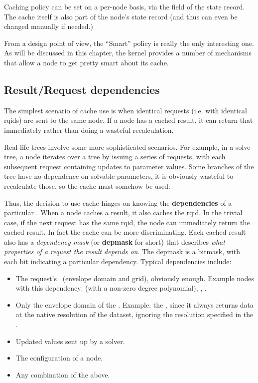   Caching policy can be set on a per-node basis, via the 
  field of the state record. The cache itself is also part of the node's state
  record (and thus can even be changed manually if needed.)

  From a design point of view, the ``Smart'' policy is really the only
  interesting one. As will be discussed in this chapter, the kernel provides a
  number of mechanisms that allow a node to get pretty smart about its cache.

\subsection{Result/Request dependencies}

  The simplest scenario of cache use is when identical requests (i.e. with
  identical rqids) are sent to the same node. If a node has a cached result, it
  can return that immediately rather than doing a wasteful recalculation.

  Real-life trees involve some more sophisticated scenarios. For example, in a
  solve-tree, a  node iterates over a tree by issuing a series of
  requests, with each subsequent request containing updates to parameter
  values. Some branches of the tree have no dependence on solvable parameters,
  it is obviously wasteful to recalculate those, so the cache must somehow be
  used.

  Thus, the decision to use cache hinges on knowing the {\bf dependencies} of a
  particular . When a node caches a result, it also caches the rqid.
  In the trivial case, if the next request has the same rqid, the node can
  immediately return the cached result. In fact the cache can be more
  discriminating. Each cached result also has a {\em dependency mask} (or {\bf
  depmask} for short) that describes {\em what properties of a request the
  result depends on}. The depmask is a bitmask, with each bit indicating a
  particular dependency. Typical dependencies include:

  \begin{itemize} 
  
  \item The request's \Cells\ (envelope domain and grid), obviously enough.
  Example nodes with this dependency:  (with a non-zero degree
  polynomial), , . 

  \item Only the envelope domain of the \Cells. Example: the , since
  it always returns data at the native resolution of the dataset, ignoring the
  resolution specified in the \Cells.

  \item Updated  values sent up by a solver.
  
  \item The configuration of a  node.

  \item Any combination of the above. 

  \end{itemize}
  
